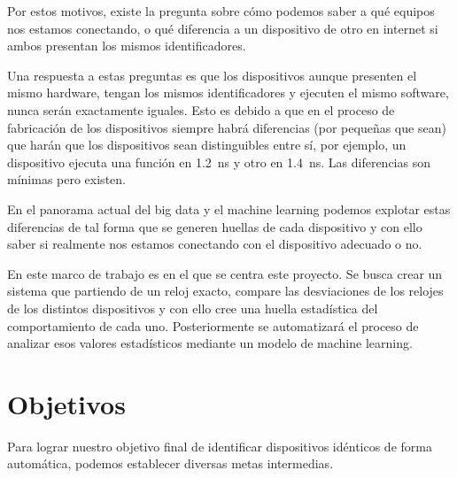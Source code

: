 Por estos motivos, existe la pregunta sobre cómo podemos saber a qué equipos nos estamos conectando, o qué diferencia a un dispositivo de otro en internet si ambos presentan los mismos identificadores.

Una respuesta a estas preguntas es que los dispositivos aunque presenten el mismo hardware, tengan los mismos identificadores y ejecuten el mismo software, nunca serán exactamente iguales. Esto es debido a que en el proceso de fabricación de los dispositivos siempre habrá diferencias (por pequeñas que sean) que harán que los dispositivos sean distinguibles entre sí, por ejemplo, un dispositivo ejecuta una función en \SI{1.2}{\nano\second} y otro en \SI{1.4}{\nano\second}. Las diferencias son mínimas pero existen.

En el panorama actual del big data y el machine learning podemos explotar estas diferencias de tal forma que se generen huellas de cada dispositivo y con ello saber si realmente nos estamos conectando con el dispositivo adecuado o no.

En este marco de trabajo es en el que se centra este proyecto. Se busca crear un sistema que partiendo de un reloj exacto, compare las desviaciones de los relojes de los distintos dispositivos y con ello cree una huella estadística del comportamiento de cada uno. Posteriormente se automatizará el proceso de analizar esos valores estadísticos mediante un modelo de machine learning.

\section{Objetivos}

Para lograr nuestro objetivo final de identificar dispositivos idénticos de forma automática, podemos establecer diversas metas intermedias.

